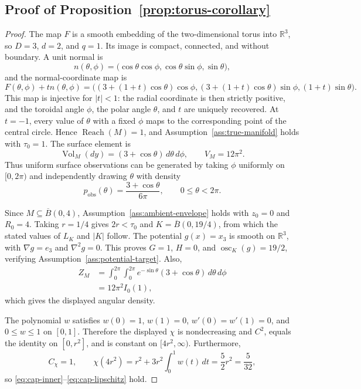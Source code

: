 \documentclass{article}
\newcommand{\R}{\mathbb R}
\newcommand{\Vol}{\operatorname{Vol}}
\newcommand{\Reach}{\operatorname{Reach}}
\newcommand{\osc}{\operatorname{osc}}
\numberwithin{equation}{section}
\begin{document}
\subsection{Proof of Proposition~\ref{prop:torus-corollary}}



\begin{proof}
The map $F$ is a smooth embedding of the two-dimensional torus into
$\R^3$, so $D=3$, $d=2$, and $q=1$. Its image is compact, connected, and
without boundary. A unit normal is
\[
 n(\theta,\phi)
 =\bigl(\cos\theta\cos\phi,
        \cos\theta\sin\phi,
        \sin\theta\bigr),
\]
and the normal-coordinate map is
\[
 F(\theta,\phi)+t n(\theta,\phi)
 =\bigl((3+(1+t)\cos\theta)\cos\phi,
        (3+(1+t)\cos\theta)\sin\phi,
        (1+t)\sin\theta\bigr).
\]
This map is injective for $|t|<1$: the radial coordinate is then strictly
positive, and the toroidal angle $\phi$, the polar angle $\theta$, and $t$
are uniquely recovered. At $t=-1$, every value of $\theta$ with a fixed
$\phi$ maps to the corresponding point of the central circle. Hence
$\Reach(M)=1$, and Assumption~\ref{ass:true-manifold} holds with
$\tau_0=1$. The surface element is
\[
 \Vol_M(dy)=(3+\cos\theta)\,d\theta\,d\phi,
 \qquad V_M=12\pi^2.
\]
Thus uniform surface observations can be generated by taking $\phi$
uniformly on $[0,2\pi)$ and independently drawing $\theta$ with density
\[
 p_{\mathrm{obs}}(\theta)=\frac{3+\cos\theta}{6\pi},
 \qquad 0\le\theta<2\pi.
\]

Since $M\subseteq\overline B(0,4)$,
Assumption~\ref{ass:ambient-envelope} holds with $z_0=0$ and $R_0=4$.
Taking $r=1/4$ gives $2r<\tau_0$ and
$K=\overline B(0,19/4)$, from which the stated values of $L_K$ and $|K|$
follow. The potential $g(x)=x_3$ is smooth on $\R^3$, with
$\nabla g=e_3$ and $\nabla^2g=0$. This proves
$G=1$, $H=0$, and $\osc_K(g)=19/2$, verifying
Assumption~\ref{ass:potential-target}. Also,
\[
 \begin{aligned}
 Z_M
 &=\int_0^{2\pi}\int_0^{2\pi}
   e^{-\sin\theta}(3+\cos\theta)\,d\theta\,d\phi\\
 &=12\pi^2I_0(1),
 \end{aligned}
\]
which gives the displayed angular density.

The polynomial $w$ satisfies $w(0)=1$, $w(1)=0$,
$w'(0)=w'(1)=0$, and $0\le w\le1$ on $[0,1]$. Therefore the displayed
$\chi$ is nondecreasing and $C^2$, equals the identity on $[0,r^2]$, and
is constant on $[4r^2,\infty)$. Furthermore,
\[
 C_\chi=1,
 \qquad
 \chi(4r^2)
 =r^2+3r^2\int_0^1w(t)\,dt
 =\frac52r^2=\frac{5}{32},
\]
so \eqref{eq:cap-inner}--\eqref{eq:cap-lipschitz} hold.


\end{proof}
\end{document}
